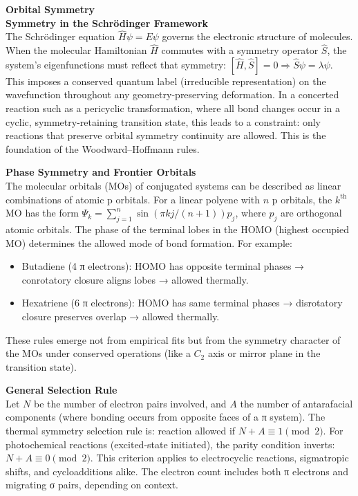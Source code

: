 \begin{technical}
{\Large\textbf{Orbital Symmetry}}\\[0.4em]

\noindent\textbf{Symmetry in the Schrödinger Framework}\\[0.3em]
The Schrödinger equation \( \hat{H}\psi = E\psi \) governs the electronic structure of molecules. When the molecular Hamiltonian \( \hat{H} \) commutes with a symmetry operator \( \hat{S} \), the system's eigenfunctions must reflect that symmetry: \([\hat{H}, \hat{S}] = 0 \Rightarrow \hat{S}\psi = \lambda\psi\). This imposes a conserved quantum label (irreducible representation) on the wavefunction throughout any geometry-preserving deformation. In a concerted reaction such as a pericyclic transformation, where all bond changes occur in a cyclic, symmetry-retaining transition state, this leads to a constraint: only reactions that preserve orbital symmetry continuity are allowed. This is the foundation of the Woodward–Hoffmann rules.

\noindent\textbf{Phase Symmetry and Frontier Orbitals}\\[0.3em]
The molecular orbitals (MOs) of conjugated systems can be described as linear combinations of atomic p orbitals. For a linear polyene with \( n \) p orbitals, the \( k^\text{th} \) MO has the form \(\Psi_k = \sum_{j=1}^n \sin(\pi k j/(n+1)) p_j\), where \( p_j \) are orthogonal atomic orbitals. The phase of the terminal lobes in the HOMO (highest occupied MO) determines the allowed mode of bond formation. For example:
\begin{itemize}
\item Butadiene (4 π electrons): HOMO has opposite terminal phases → conrotatory closure aligns lobes → allowed thermally.
\item Hexatriene (6 π electrons): HOMO has same terminal phases → disrotatory closure preserves overlap → allowed thermally.
\end{itemize}
These rules emerge not from empirical fits but from the symmetry character of the MOs under conserved operations (like a \( C_2 \) axis or mirror plane in the transition state).

\noindent\textbf{General Selection Rule}\\[0.3em]
Let \( N \) be the number of electron pairs involved, and \( A \) the number of antarafacial components (where bonding occurs from opposite faces of a π system). The thermal symmetry selection rule is: reaction allowed if \(N + A \equiv 1 \pmod{2}\). For photochemical reactions (excited-state initiated), the parity condition inverts: \(N + A \equiv 0 \pmod{2}\). This criterion applies to electrocyclic reactions, sigmatropic shifts, and cycloadditions alike. The electron count includes both π electrons and migrating σ pairs, depending on context.


\end{technical}
